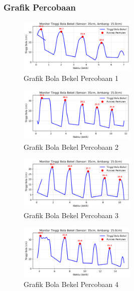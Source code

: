 \subsubsection{Grafik Percobaan}
\begin{figure}[htbp]
    \centering
    \includegraphics[width=0.5\textwidth]{chapters/DataPercobaan/Grafik_Bola_Bekel_1.png}
    \caption{Grafik Bola Bekel Percobaan 1}
\end{figure}
\begin{figure}[htbp]
    \centering
    \includegraphics[width=0.5\textwidth]{chapters/DataPercobaan/Grafik_Bola_Bekel_2.png}
    \caption{Grafik Bola Bekel Percobaan 2}
\end{figure}
\begin{figure}[htbp]
    \centering
    \includegraphics[width=0.5\textwidth]{chapters/DataPercobaan/Grafik_Bola_Bekel_3.png}
    \caption{Grafik Bola Bekel Percobaan 3}
\end{figure}
\begin{figure}[htbp]
    \centering
    \includegraphics[width=0.5\textwidth]{chapters/DataPercobaan/Grafik_Bola_Bekel_4.png}
    \caption{Grafik Bola Bekel Percobaan 4}
\end{figure}
